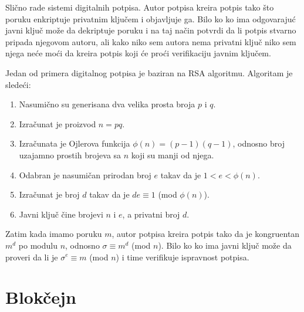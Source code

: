 \documentclass[a4paper]{article}
\begin{document}
Slično rade sistemi digitalnih potpisa. Autor potpisa kreira potpis tako što poruku enkriptuje privatnim ključem i objavljuje ga. Bilo ko ko ima odgovarajuć javni ključ može da dekriptuje poruku i na taj način potvrdi da li potpis stvarno pripada njegovom autoru, ali kako niko sem autora nema privatni ključ niko sem njega neće moći da kreira potpis koji će proći verifikaciju javnim ključem. 

Jedan od primera digitalnog potpisa je baziran na RSA algoritmu. Algoritam je sledeći:
\begin{enumerate}   
    \item Nasumično su generisana dva velika prosta broja $p$ i $q$.
    \item Izračunat je proizvod $n = pq$.
    \item Izračunata je Ojlerova funkcija $\phi(n)=(p - 1)(q - 1)$, odnosno broj uzajamno prostih brojeva sa $n$ koji su manji od njega.
    \item  Odabran je nasumičan prirodan broj $e$ takav da je $1 < e < \phi(n)$.
    \item Izračunat je broj $d$ takav da je $de \equiv 1$ (mod $\phi(n)$).
    \item Javni ključ čine brojevi $n$ i $e$, a privatni broj $d$.
\end{enumerate}

Zatim kada imamo poruku $m$, autor potpisa kreira potpis tako da je kongruentan $m^{d}$ po modulu $n$, odnosno $\sigma \equiv m^{d}$ (mod $n$). Bilo ko ko ima javni ključ može da proveri da li je  ${\sigma}^{e} \equiv m$ (mod $n$) i time verifikuje ispravnost potpisa.


\section{Blokčejn}
\label{sec:blockchain}
\end{document}

